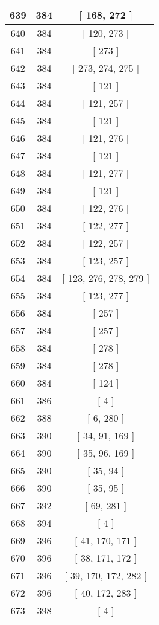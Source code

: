 \begin{center}
\begin{longtable}[H]{|| c c c ||}
\hline
639 & 384 & [ 168, 272 ] \\ 
\hline
640 & 384 & [ 120, 273 ] \\ 
\hline
641 & 384 & [ 273 ] \\ 
\hline
642 & 384 & [ 273, 274, 275 ] \\ 
\hline
643 & 384 & [ 121 ] \\ 
\hline
644 & 384 & [ 121, 257 ] \\ 
\hline
645 & 384 & [ 121 ] \\ 
\hline
646 & 384 & [ 121, 276 ] \\ 
\hline
647 & 384 & [ 121 ] \\ 
\hline
648 & 384 & [ 121, 277 ] \\ 
\hline
649 & 384 & [ 121 ] \\ 
\hline
650 & 384 & [ 122, 276 ] \\ 
\hline
651 & 384 & [ 122, 277 ] \\ 
\hline
652 & 384 & [ 122, 257 ] \\ 
\hline
653 & 384 & [ 123, 257 ] \\ 
\hline
654 & 384 & [ 123, 276, 278, 279 ] \\ 
\hline
655 & 384 & [ 123, 277 ] \\ 
\hline
656 & 384 & [ 257 ] \\ 
\hline
657 & 384 & [ 257 ] \\ 
\hline
658 & 384 & [ 278 ] \\ 
\hline
659 & 384 & [ 278 ] \\ 
\hline
660 & 384 & [ 124 ] \\ 
\hline
661 & 386 & [ 4 ] \\ 
\hline
662 & 388 & [ 6, 280 ] \\ 
\hline
663 & 390 & [ 34, 91, 169 ] \\ 
\hline
664 & 390 & [ 35, 96, 169 ] \\ 
\hline
665 & 390 & [ 35, 94 ] \\ 
\hline
666 & 390 & [ 35, 95 ] \\ 
\hline
667 & 392 & [ 69, 281 ] \\ 
\hline
668 & 394 & [ 4 ] \\ 
\hline
669 & 396 & [ 41, 170, 171 ] \\ 
\hline
670 & 396 & [ 38, 171, 172 ] \\ 
\hline
671 & 396 & [ 39, 170, 172, 282 ] \\ 
\hline
672 & 396 & [ 40, 172, 283 ] \\ 
\hline
673 & 398 & [ 4 ] \\ 

\end{longtable}
\end{center}
